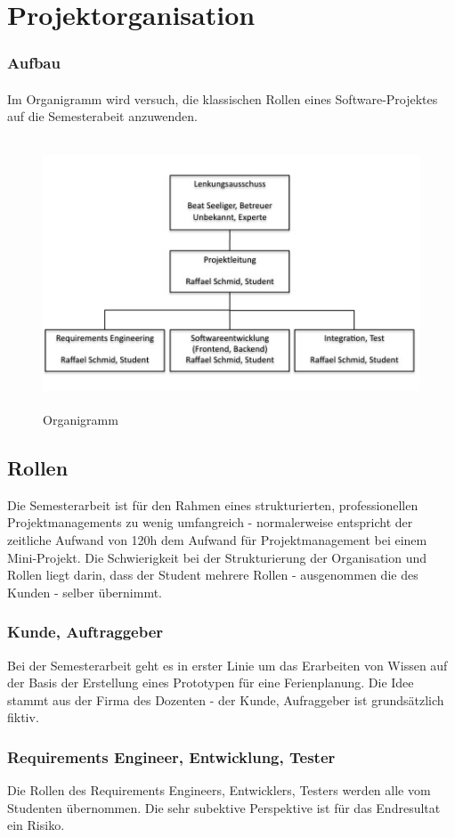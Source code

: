 \chapter{Projektorganisation}
\subsection{Aufbau}
\subsubsection{}
Im Organigramm wird versuch, die klassischen Rollen eines Software-Projektes auf die Semesterabeit anzuwenden.

\begin{figure}[h]
	\centering
	\includegraphics[height=8cm]{orgchart/Slide1}
	\caption[Organigramm]{Organigramm}
\end{figure}


\section{Rollen}
Die Semesterarbeit ist f\"ur den Rahmen eines strukturierten, professionellen Projektmanagements zu wenig umfangreich - normalerweise entspricht der zeitliche Aufwand von 120h dem Aufwand f\"ur Projektmanagement bei einem Mini-Projekt. Die Schwierigkeit bei der Strukturierung der Organisation und Rollen liegt darin, dass der Student mehrere Rollen - ausgenommen die des Kunden - selber \"ubernimmt. 

\subsection{Kunde, Auftraggeber}
Bei der Semesterarbeit geht es in erster Linie um das Erarbeiten von Wissen auf der Basis der Erstellung eines Prototypen f\"ur eine Ferienplanung. Die Idee stammt aus der Firma des Dozenten - der Kunde, Aufraggeber ist grunds\"atzlich fiktiv. 

\subsection{Requirements Engineer, Entwicklung, Tester}
Die Rollen des Requirements Engineers, Entwicklers, Testers werden alle vom Studenten \"ubernommen. Die sehr subektive Perspektive ist f\"ur das Endresultat ein Risiko.
